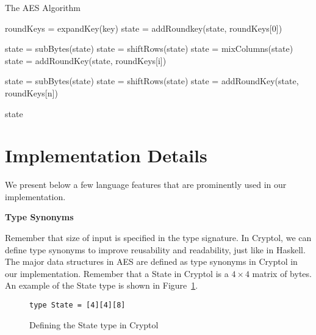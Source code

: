 \documentclass[a4paper, notitlepage]{report}
\renewcommand{\paragraph}[1]{\vspace*{1em}\noindent\textbf{#1}\hspace*{1em}}
\begin{document}
\begin{algorithm}
  \caption{The AES Algorithm}
  \label{alg:aes}
  \begin{algorithmic}[1]
    \State roundKeys = expandKey(key)
    \State 
    \State state = addRoundkey(state, roundKeys[0])

    \State state = subBytes(state)
    \State state = shiftRows(state)
    \State state = mixColumns(state)
    \State state = addRoundKey(state, roundKeys[i])
    \EndFor

    \State state = subBytes(state)
    \State state = shiftRows(state)
    \State state = addRoundKey(state, roundKeys[n])
    \State {}

    \State \Return state
    
  \end{algorithmic}
\end{algorithm}


\section{Implementation Details}


We present below a few language features that are prominently used in our
implementation.

\paragraph{Type Synonyms}

Remember that size of input is specified in the type signature.
In Cryptol, we can define type synonyms to improve reusability and readability,
just like in Haskell.
The major data structures in AES are defined as type synonyms in Cryptol in our
implementation.
Remember that a State in Cryptol is a $4 \times 4$ matrix of bytes. An example
of the State type is shown in Figure~\ref{fig:typedef}.

\begin{figure}
  \begin{lstlisting}[frame=single]
    type State = [4][4][8]
  \end{lstlisting}
  \caption{Defining the State type in Cryptol}
  \label{fig:typedef}
\end{figure}
\end{document}
